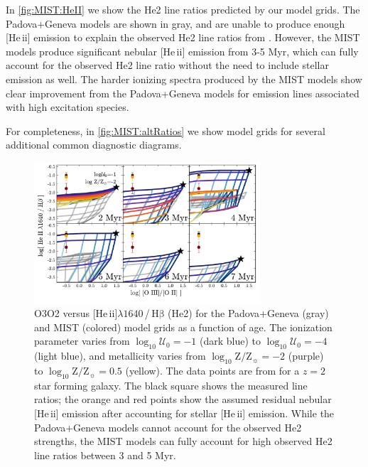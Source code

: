 \documentclass[linenumbers, tighten, trackchanges]{aastex61}%
\newcommand{\Fig}[1]{\autoref{fig:#1}}
\newcommand{\logten}{\ensuremath{\log_{10}}}
\newcommand{\sii}{[S\,{\sc ii}]\xspace}
\newcommand{\heii}{[He\,{\sc ii}]\xspace}
\newcommand{\ha}{\ensuremath{\mathrm{H\alpha}}}
\newcommand{\hb}{\ensuremath{\mathrm{H\beta}}}
\newcommand\lam[1]{\ensuremath{\lambda #1}}
\newcommand{\logZeq}[1]{\ensuremath{\logten \mathrm{Z}/\mathrm{Z}_{\sun} = #1}}
\newcommand{\logU}{\ensuremath{\logten \mathcal{U}_0}}
\begin{document}
In \Fig{MIST:HeII} we show the He2 line ratios predicted by our model grids. The Padova+Geneva models are shown in gray, and are unable to produce enough \heii emission to explain the observed He2 line ratios from \citet{Steidel16}. However, the MIST models produce significant nebular \heii emission from 3-5 Myr, which can fully account for the observed He2 line ratio without the need to include stellar emission as well. The harder ionizing spectra produced by the MIST models show clear improvement from the Padova+Geneva models for emission lines associated with high excitation species.

For completeness, in \Fig{MIST:altRatios} we show  model grids for several additional common diagnostic diagrams\added{, including R23 and \sii{}/\ha{}}. 
\begin{figure}[!htbp]
  \begin{centering}
    \includegraphics[width=0.75\textwidth]{f25.pdf}
    \caption{O3O2 versus \heii\lam{1640}\,/\,\hb{} (He2) for the Padova+Geneva (gray) and MIST (colored) model grids as a function of age. The ionization parameter varies from $\logU{}=-1$ (dark blue) to $\logU{}=-4$ (light blue), and metallicity varies from \logZeq{-2} (purple) to \logZeq{0.5} (yellow). The data points are from \citet{Steidel16} for a $z=2$ star forming galaxy. The black square shows the measured line ratios; the orange and red points show the assumed residual nebular \heii{} emission after accounting for stellar \heii{} emission. While the Padova+Geneva models cannot account for the observed He2 strengths, the MIST models can fully account for high observed He2 line ratios between 3 and 5 Myr.}
    \label{fig:MIST:HeII}
  \end{centering}
\end{figure}
\end{document}
